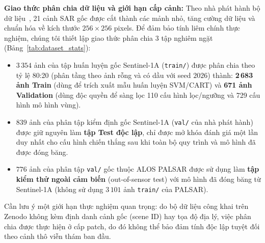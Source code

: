 \noindent\textbf{Giao thức phân chia dữ liệu và giới hạn cấp cảnh:}
Theo nhà phát hành bộ dữ liệu~\cite{zuenko2025refined}, 21 cảnh SAR gốc được cắt thành các mảnh nhỏ, tăng cường dữ liệu và chuẩn hóa về kích thước $256 \times 256$ pixels. Để đảm bảo tính liêm chính thực nghiệm, chúng tôi thiết lập giao thức phân chia 3 tập nghiêm ngặt (Bảng~\ref{tab:dataset_stats}):
\begin{itemize}
    \item $3\,354$ ảnh của tập huấn luyện gốc Sentinel-1A (\texttt{train/}) được phân chia theo tỷ lệ 80:20 (phân tầng theo ảnh rỗng và có dầu với seed $2026$) thành: \textbf{2\,683 ảnh Train} (dùng để trích xuất mẫu huấn luyện SVM/CART) và \textbf{671 ảnh Validation} (dùng độc quyền để sàng lọc 110 cấu hình lọc/ngưỡng và 729 cấu hình mô hình vùng).
    \item $839$ ảnh của phân tập kiểm định gốc Sentinel-1A (\texttt{val/} của nhà phát hành) được giữ nguyên làm \textbf{tập Test độc lập}, chỉ được mở khóa đánh giá một lần duy nhất cho cấu hình chiến thắng sau khi toàn bộ quy trình và mô hình đã được đóng băng.
    \item $776$ ảnh của phân tập \texttt{val/} gốc thuộc ALOS PALSAR được sử dụng làm \textbf{tập kiểm thử ngoài cảm biến} (out-of-sensor test) với mô hình đã đóng băng từ Sentinel-1A (không sử dụng $3\,101$ ảnh \texttt{train/} của PALSAR).
\end{itemize}
Cần lưu ý một giới hạn thực nghiệm quan trọng: do bộ dữ liệu công khai trên Zenodo không kèm định danh cảnh gốc (scene ID) hay tọa độ địa lý, việc phân chia được thực hiện ở cấp patch, do đó không thể bảo đảm tính độc lập tuyệt đối theo cảnh thô viễn thám ban đầu.

